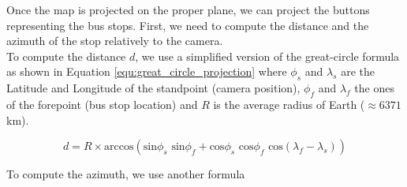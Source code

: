 Once the map is projected on the proper plane, we can project the buttons representing the bus stops. First, we need to compute the distance and the azimuth of the stop relatively to the camera.\\

To compute the distance $d$, we use a simplified version of the great-circle formula as shown in Equation \ref{equ:great_circle_projection} where $\phi_s$ and $\lambda_s$ are the Latitude and Longitude of the standpoint (camera position), $\phi_f$ and $\lambda_f$ the ones of the forepoint (bus stop location) and $R$ is the average radius of Earth ($\approx6371$km).

\begin{equation}
\label{equ:great_circle_projection}
d =  R \times \textrm{arccos}\left(\textrm{sin}\phi_s \textrm{ sin}\phi_f + \textrm{cos}\phi_s \textrm{ cos}\phi_f \textrm{ cos}(\lambda_f-\lambda_s)\right)
\end{equation}

To compute the azimuth, we use another formula